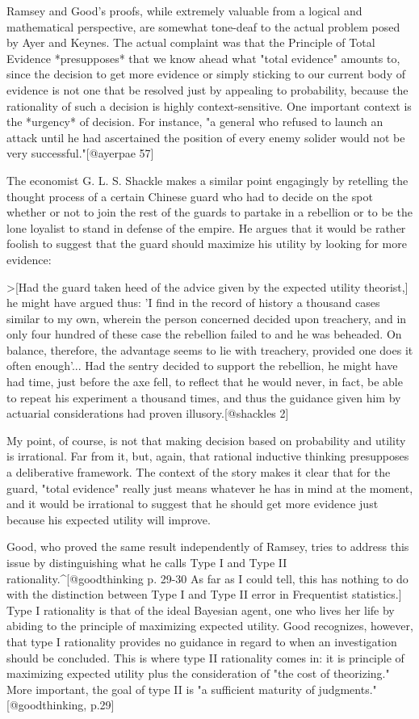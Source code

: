 Ramsey and Good's proofs, while extremely valuable from a logical and
mathematical perspective, are somewhat tone-deaf to the actual problem
posed by Ayer and Keynes. The actual complaint was that the Principle of
Total Evidence *presupposes* that we know ahead what "total evidence"
amounts to, since the decision to get more evidence or simply sticking
to our current body of evidence is not one that be resolved just by
appealing to probability, because the rationality of such a decision is
highly context-sensitive. One important context is the *urgency* of
decision. For instance, "a general who refused to launch an attack until
he had ascertained the position of every enemy solider would not be very
successful."{[}@ayerpae 57{]}

The economist G. L. S. Shackle makes a similar point engagingly by
retelling the thought process of a certain Chinese guard who had to
decide on the spot whether or not to join the rest of the guards to
partake in a rebellion or to be the lone loyalist to stand in defense of
the empire. He argues that it would be rather foolish to suggest that
the guard should maximize his utility by looking for more evidence:

\textgreater{}{[}Had the guard taken heed of the advice given by the
expected utility theorist,{]} he might have argued thus: 'I find in the
record of history a thousand cases similar to my own, wherein the person
concerned decided upon treachery, and in only four hundred of these case
the rebellion failed to and he was beheaded. On balance, therefore, the
advantage seems to lie with treachery, provided one does it often
enough'... Had the sentry decided to support the rebellion, he might
have had time, just before the axe fell, to reflect that he would never,
in fact, be able to repeat his experiment a thousand times, and thus the
guidance given him by actuarial considerations had proven
illusory.{[}@shackles 2{]}

My point, of course, is not that making decision based on probability
and utility is irrational. Far from it, but, again, that rational
inductive thinking presupposes a deliberative framework. The context of
the story makes it clear that for the guard, "total evidence" really
just means whatever he has in mind at the moment, and it would be
irrational to suggest that he should get more evidence just because his
expected utility will improve.

Good, who proved the same result independently of Ramsey, tries to
address this issue by distinguishing what he calls Type I and Type II
rationality.\^{}{[}@goodthinking p. 29-30 As far as I could tell, this
has nothing to do with the distinction between Type I and Type II error
in Frequentist statistics.{]} Type I rationality is that of the ideal
Bayesian agent, one who lives her life by abiding to the principle of
maximizing expected utility. Good recognizes, however, that type I
rationality provides no guidance in regard to when an investigation
should be concluded. This is where type II rationality comes in: it is
principle of maximizing expected utility plus the consideration of "the
cost of theorizing." More important, the goal of type II is "a
sufficient maturity of judgments."{[}@goodthinking, p.29{]}

